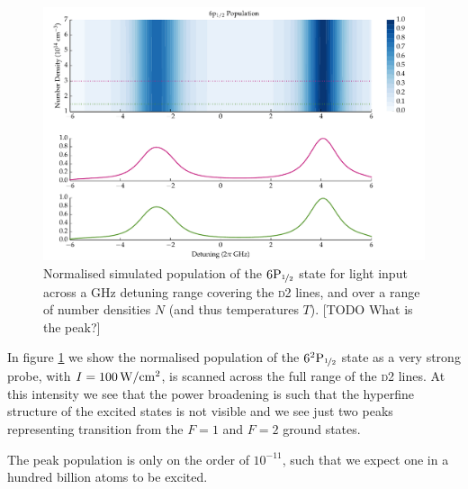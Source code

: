     \begin{figure}[]
    \includegraphics[width=\linewidth]
        {figs/05_twophoton/rb87_5spd6p_hf_solve_scan_f01_fig2.pdf}
    \caption{
    Normalised simulated population of the $6\rm{P}_{\nicefrac{1}{2}}$ state for
    light input across a GHz detuning range covering the \textsc{d2} lines, and
    over a range of number densities $N$ (and thus temperatures $T$).
    [TODO What is the peak?]
    }
    \label{fig:blue_plot_model} 
    \end{figure}

    In figure \ref{fig:blue_plot_model} we show the normalised population of the
    $6^2\rm{P}_{\nicefrac{1}{2}}$ state as a very strong probe, with $I =
    \unit[100]{W/cm^2}$, is scanned across the full range of the \textsc{d2}
    lines. At this intensity we see that the power broadening is such that the
    hyperfine structure of the excited states is not visible and we see just two
    peaks representing transition from the $F = 1$ and $F = 2$ ground states.

    The peak population is only on the order of $10^{-11}$, such that we expect
    one in a hundred billion atoms to be excited.